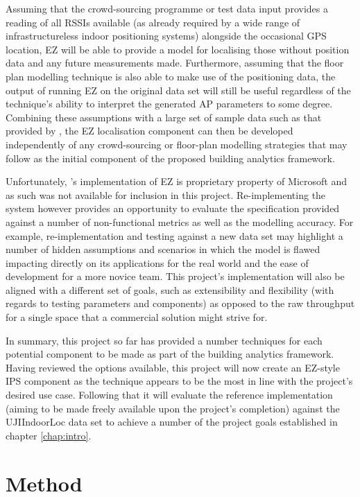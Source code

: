 \documentclass{UoYCSproject}
\begin{document}
        Assuming that the crowd-sourcing programme or test data input provides a reading of all RSSIs available (as already required by a wide range of infrastructureless indoor positioning systems) alongside the occasional GPS location, EZ will be able to provide a model for localising those without position data and any future measurements made. Furthermore, assuming that the floor plan modelling technique is also able to make use of the positioning data, the output of running EZ on the original data set will still be useful regardless of the technique's ability to interpret the generated AP parameters to some degree. Combining these assumptions with a large set of sample data such as that provided by \citet{torres2014ujiindoorloc}, the EZ localisation component can then be developed independently of any crowd-sourcing or floor-plan modelling strategies that may follow as the initial component of the proposed building analytics framework.
        
        Unfortunately, \citeauthor{chintalapudi2010indoor}'s implementation of EZ is proprietary property of Microsoft and as such was not available for inclusion in this project. Re-implementing the system however provides an opportunity to evaluate the specification provided against a number of non-functional metrics as well as the modelling accuracy. For example, re-implementation and testing against a new data set may highlight a number of hidden assumptions and scenarios in which the model is flawed impacting directly on its applications for the real world and the ease of development for a more novice team. This project's implementation will also be aligned with a different set of goals, such as extensibility and flexibility (with regards to testing parameters and components) as opposed to the raw throughput for a single space that a commercial solution might strive for.
        
        In summary, this project so far has provided a number techniques for each potential component to be made as part of the building analytics framework. Having reviewed the options available, this project will now create an EZ-style IPS component as the technique appears to be the most in line with the project's desired use case. Following that it will evaluate the reference implementation (aiming to be made freely available upon the project's completion) against the UJIIndoorLoc data set to achieve a number of the project goals established in chapter \ref{chap:intro}.
 
	\chapter{Method}
    \label{chap:method}
	
\end{document}
